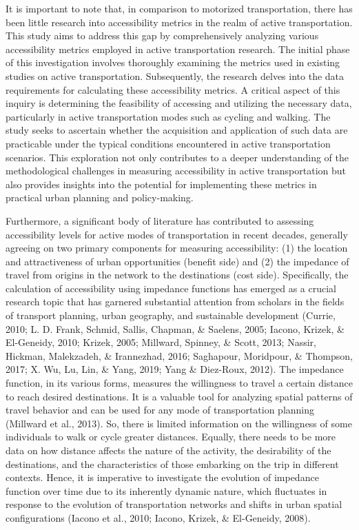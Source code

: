 \documentclass[
11pt, %
oneside, %
english, %
singlespacing, %
]{macthesis} %
\begin{document}
It is important to note that, in comparison to motorized transportation, there has been little research into accessibility metrics in the realm of active transportation. This study aims to address this gap by comprehensively analyzing various accessibility metrics employed in active transportation research. The initial phase of this investigation involves thoroughly examining the metrics used in existing studies on active transportation. Subsequently, the research delves into the data requirements for calculating these accessibility metrics. A critical aspect of this inquiry is determining the feasibility of accessing and utilizing the necessary data, particularly in active transportation modes such as cycling and walking. The study seeks to ascertain whether the acquisition and application of such data are practicable under the typical conditions encountered in active transportation scenarios. This exploration not only contributes to a deeper understanding of the methodological challenges in measuring accessibility in active transportation but also provides insights into the potential for implementing these metrics in practical urban planning and policy-making.

Furthermore, a significant body of literature has contributed to assessing accessibility levels for active modes of transportation in recent decades, generally agreeing on two primary components for measuring accessibility: (1) the location and attractiveness of urban opportunities (benefit side) and (2) the impedance of travel from origins in the network to the destinations (cost side). Specifically, the calculation of accessibility using impedance functions has emerged as a crucial research topic that has garnered substantial attention from scholars in the fields of transport planning, urban geography, and sustainable development (Currie, 2010; L. D. Frank, Schmid, Sallis, Chapman, \& Saelens, 2005; Iacono, Krizek, \& El-Geneidy, 2010; Krizek, 2005; Millward, Spinney, \& Scott, 2013; Nassir, Hickman, Malekzadeh, \& Irannezhad, 2016; Saghapour, Moridpour, \& Thompson, 2017; X. Wu, Lu, Lin, \& Yang, 2019; Yang \& Diez-Roux, 2012). The impedance function, in its various forms, measures the willingness to travel a certain distance to reach desired destinations. It is a valuable tool for analyzing spatial patterns of travel behavior and can be used for any mode of transportation planning (Millward et al., 2013). So, there is limited information on the willingness of some individuals to walk or cycle greater distances. Equally, there needs to be more data on how distance affects the nature of the activity, the desirability of the destinations, and the characteristics of those embarking on the trip in different contexts. Hence, it is imperative to investigate the evolution of impedance function over time due to its inherently dynamic nature, which fluctuates in response to the evolution of transportation networks and shifts in urban spatial configurations (Iacono et al., 2010; Iacono, Krizek, \& El-Geneidy, 2008).
\end{document}

